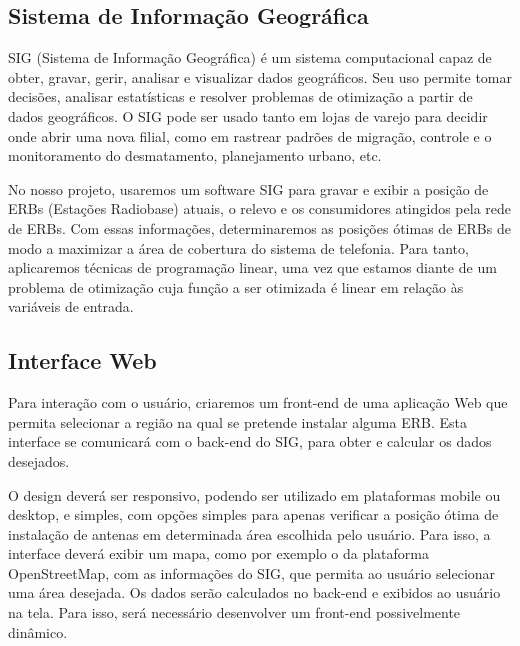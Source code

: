 \documentclass[12pt,a4paper]{article}
\begin{document}
\subsection{Sistema de Informação Geográfica}
SIG (Sistema de Informação Geográfica) é um sistema computacional capaz de
obter, gravar, gerir, analisar e visualizar dados geográficos. Seu uso permite
tomar decisões, analisar estatísticas e resolver problemas de otimização a
partir de dados geográficos. O SIG pode ser usado tanto em lojas de varejo para
decidir onde abrir uma nova filial, como em rastrear padrões de migração,
controle e o monitoramento do desmatamento, planejamento urbano, etc.

No nosso projeto, usaremos um software SIG para gravar e exibir a posição de
ERBs (Estações Radiobase) atuais, o relevo e os consumidores atingidos pela
rede de ERBs. Com essas informações, determinaremos as posições ótimas de
ERBs de modo a maximizar a área de cobertura do sistema de telefonia.
Para tanto, aplicaremos técnicas de programação linear, uma vez que
estamos diante de um problema de otimização cuja função a ser otimizada
é linear em relação às variáveis de entrada.

\subsection{Interface Web}
Para interação com o usuário, criaremos um front-end de uma aplicação Web que
permita selecionar a região na qual se pretende instalar alguma ERB.
Esta interface se comunicará com o back-end do SIG, para obter e calcular os
dados desejados.

O design deverá ser responsivo, podendo ser utilizado em plataformas mobile
ou desktop, e simples, com opções simples para apenas verificar a posição ótima
de instalação de antenas em determinada área escolhida pelo usuário. Para isso,
a interface deverá exibir um mapa, como por exemplo o da plataforma
OpenStreetMap, com as informações do SIG, que permita ao usuário selecionar uma
área desejada. Os dados serão calculados no back-end e exibidos ao usuário na
tela. Para isso, será necessário desenvolver um front-end possivelmente
dinâmico.
\end{document}
